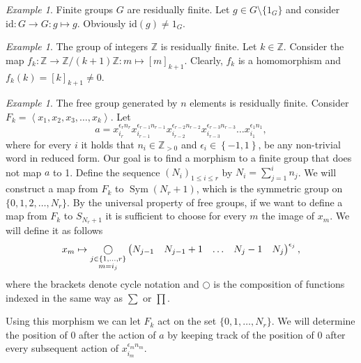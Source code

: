 \documentclass[titlepage, a4paper]{article}
\newcommand{\Z}{\mathbb{Z}}
\newcommand{\id}{\mathrm{id}}
\DeclareMathOperator{\sym}{Sym}
\def\ext{\qopname\relax m{\bigcirc}}
\theoremstyle{theoremdd}
\theoremstyle{definition}
\theoremstyle{remark}
\newtheorem{example}[theorem]{Example}
\begin{document}
\begin{example}
	Finite groups $G$ are residually finite. Let $g \in G \setminus \{1_G\}$ and consider $\id: G \to G: g \mapsto g$. Obviously $\id(g) \neq 1_G$.
\end{example}


\begin{example}
	The group of integers $\mathbb Z$ is residually finite. Let $k \in \mathbb Z$. Consider the map $f_k: \mathbb Z \to \mathbb Z/(k+1)\mathbb Z: m \mapsto [m]_{k+1}$. Clearly, $f_k$ is a homomorphism and $f_k(k) = [k]_{k+1} \neq 0$.
\end{example}

\begin{example}\label{ex:free_group_residually_finite}
	The free group generated by $n$ elements is residually finite. 
	Consider $F_k = \left<x_1, x_2, x_3, \ldots, x_k \right>$.  %
Let \[
a = x_{i_r}^{\epsilon_r n_r}x_{i_{r-1}}^{\epsilon_{r-1}n_{r-1}}x_{i_{r-2}}^{\epsilon_{r-2}n_{r-2}}x_{i_{r-3}}^{\epsilon_{r-3}n_{r-3}} \ldots x_{i_1}^{\epsilon_1n_1}
,\]
where for every $i$ it holds that $n_i \in \Z_{>0}$ and $\epsilon_i \in \left\{ -1,1 \right\} $, be any non-trivial word in reduced form. 
Our goal is to find a morphism to a finite group that does not map $a$ to 1. 
Define the sequence $(N_i)_{1 \leq i \leq r}$ by $N_i = \sum_{j = 1}^{i} n_j$. 
We will construct a map from $F_k$ to $\sym(N_r + 1)$, which is the symmetric group on $\{0,1, 2, \ldots, N_{r}\} $.   %
By the universal property of free groups, if we want to define a map from $F_k$ to $S_{N_r +1}$ it is sufficient to choose for every $m$ the image of $x_m$.
We will define it as follows
\[
	x_m \mapsto \ext_{\substack{j \in \{1,\ldots, r\} \\ m = i_j} } \begin{pmatrix} N_{j-1} & N_{j-1} +  1& \ldots & N_{j} -1 & N_{j} \end{pmatrix}^{\epsilon_j}%
,\] 
where the brackets denote cycle notation and $\bigcirc$ is the composition of functions indexed in the same way as  $\sum$ or $\prod$.

Using this morphism we can let $F_k$ act on the set $\{0,1,\ldots, N_r\} $. 
We will determine the position of $0$ after the action of $a$ by keeping track of the position of $0$ after every subsequent  action of  $x_{i_m}^{\epsilon_m n_m}$.


\end{example}
\end{document}
